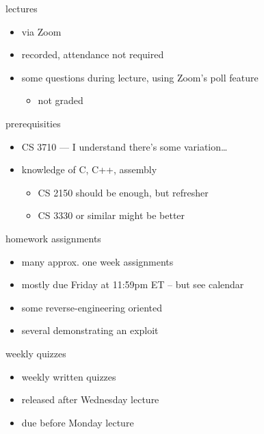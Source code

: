 \begin{frame}{lectures}
    \begin{itemize}
    \item via Zoom
    \item recorded, attendance not required
    \item some questions during lecture, using Zoom's poll feature
        \begin{itemize}
        \item not graded
        \end{itemize}
    \end{itemize}
\end{frame}

\begin{frame}{prerequisities}
    \begin{itemize}
    \item CS 3710 --- I understand there's some variation\ldots
    \item knowledge of C, C++, assembly
        \begin{itemize}
        \item CS 2150 should be enough, but refresher
        \item CS 3330 or similar might be better
        \end{itemize}
    \end{itemize}
\end{frame}

\begin{frame}{homework assignments}
\begin{itemize}
    \item many approx. one week assignments
    \item mostly due Friday at 11:59pm ET -- but see calendar
    \vspace{.5cm}
    \item some reverse-engineering oriented
    \item several demonstrating an exploit
\end{itemize}
\end{frame}

\begin{frame}{weekly quizzes}
\begin{itemize}
    \item weekly written quizzes
    \item released after Wednesday lecture
    \item due before Monday lecture
\end{itemize}
\end{frame}

